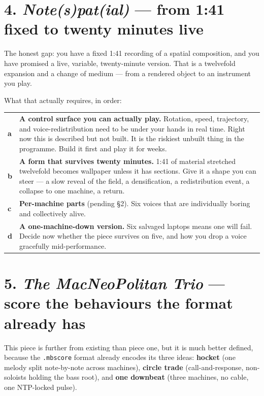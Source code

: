 \documentclass[11pt]{article}
\begin{document}
\section{4. \emph{Note(s)pat(ial)} — from 1:41 fixed to twenty minutes live}

The honest gap: you have a fixed 1:41 recording of a spatial composition, and you
have promised a live, variable, twenty-minute version. That is a twelvefold
expansion and a change of medium — from a rendered object to an instrument you
play.

What that actually requires, in order:

{\fontsize{10.4pt}{13.2pt}\selectfont
\begin{tabularx}{\linewidth}{@{}L{0.28in} Y@{}}
\textbf{a} & \textbf{A control surface you can actually play.} Rotation, speed, trajectory, and voice-redistribution need to be under your hands in real time. Right now this is described but not built. It is the riskiest unbuilt thing in the programme. Build it first and play it for weeks. \\
\textbf{b} & \textbf{A form that survives twenty minutes.} 1:41 of material stretched twelvefold becomes wallpaper unless it has sections. Give it a shape you can steer — a slow reveal of the field, a densification, a redistribution event, a collapse to one machine, a return. \\
\textbf{c} & \textbf{Per-machine parts} (pending §2). Six voices that are individually boring and collectively alive. \\
\textbf{d} & \textbf{A one-machine-down version.} Six salvaged laptops means one will fail. Decide now whether the piece survives on five, and how you drop a voice gracefully mid-performance. \\
\end{tabularx}}

\section{5. \emph{The MacNeoPolitan Trio} — score the behaviours the format already has}

This piece is further from existing than piece one, but it is much better
defined, because the \texttt{.mbscore} format already encodes its three ideas:
\textbf{hocket} (one melody split note-by-note across machines),
\textbf{circle trade} (call-and-response, non-soloists holding the bass root),
and \textbf{one downbeat} (three machines, no cable, one NTP-locked pulse).
\end{document}
